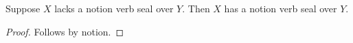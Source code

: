 

\begin{proposition}\label{notion_verb_negative_alias_negative}
    Suppose $X$ lacks a notion verb seal over $Y$.
    Then $X$ has a notion verb seal over $Y$.
\end{proposition}
\begin{proof}
    Follows by notion.
\end{proof}
